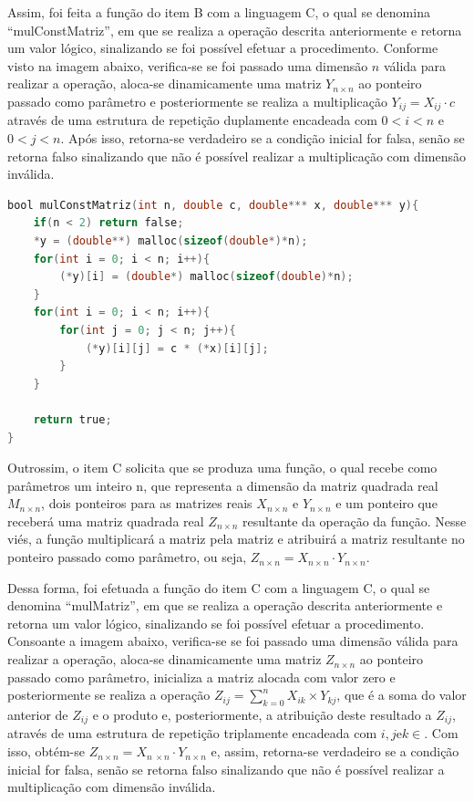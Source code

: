 \documentclass[
	12pt,				%
	oneside,			%
	a4paper,			%
	english,			%
	brazil				%
	]{abntex2ppgsi}
\begin{document}
Assim, foi feita a função do item B com a linguagem C, o qual se denomina “mulConstMatriz”, em que se realiza a operação descrita anteriormente e retorna um valor lógico, sinalizando se foi possível efetuar a procedimento. Conforme visto na imagem abaixo, verifica-se se foi passado uma dimensão $n$ válida para realizar a operação, aloca-se dinamicamente uma matriz $Y_{n \times n}$ ao ponteiro passado como parâmetro e posteriormente se realiza a multiplicação $Y_{ij}=X_{ij} \cdot c$ através de uma estrutura de repetição duplamente encadeada com $0<i<n$ e $0<j<n$. Após isso, retorna-se verdadeiro se a condição inicial for falsa, senão se retorna falso sinalizando que não é possível realizar a multiplicação com dimensão inválida.

\begin{lstlisting}[language=C, caption=Resolução de alto nível do exercício 27.B]
bool mulConstMatriz(int n, double c, double*** x, double*** y){
    if(n < 2) return false;
    *y = (double**) malloc(sizeof(double*)*n);
    for(int i = 0; i < n; i++){
        (*y)[i] = (double*) malloc(sizeof(double)*n);
    }
    for(int i = 0; i < n; i++){
        for(int j = 0; j < n; j++){
            (*y)[i][j] = c * (*x)[i][j];
        }
    }
    
    return true;
}
\end{lstlisting}

Outrossim, o item C solicita que se produza uma função, o qual recebe como parâmetros um inteiro n, que representa a dimensão da matriz quadrada real $M_{n \times n}$, dois ponteiros para as matrizes reais $X_{n \times n}$ e $Y_{n \times n}$ e um ponteiro que receberá uma matriz quadrada real $Z_{n \times n}$ resultante da operação da função. Nesse viés, a função multiplicará a matriz  pela matriz  e atribuirá a matriz resultante no ponteiro passado como parâmetro, ou seja, $Z_{n \times n} = X_{n \times n} \cdot Y_{n \times n}$.

Dessa forma, foi efetuada a função do item C com a linguagem C, o qual se denomina “mulMatriz”, em que se realiza a operação descrita anteriormente e retorna um valor lógico, sinalizando se foi possível efetuar a procedimento.  Consoante a imagem abaixo, verifica-se se foi passado uma dimensão  válida para realizar a operação, aloca-se dinamicamente uma matriz $Z_{n \times n}$ ao ponteiro passado como parâmetro, inicializa a matriz alocada com valor zero e posteriormente se realiza a operação $Z_{ij}= \sum_{k=0}^{n}X_{ik}\times Y_{kj}$, 	que é a soma do valor anterior de $Z_{ij}$ e o produto e, posteriormente, a atribuição deste resultado a $Z_{ij}$, através de uma estrutura de repetição triplamente encadeada com $i, j \text{e} k \in $. Com isso, obtém-se $Z_{n \times n}=X_{n\ \times n} \cdot Y_{n \times n}$ e, assim, retorna-se verdadeiro se a condição inicial for falsa, senão se retorna falso sinalizando que não é possível realizar a multiplicação com dimensão inválida.
\end{document}
